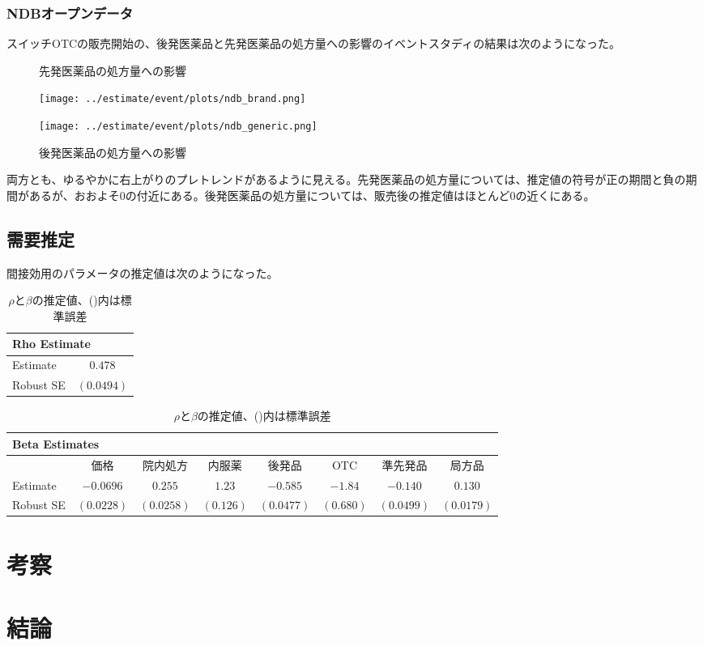 \documentclass[a4paper,11pt,uplatex]{jsarticle}
\theoremstyle{definition}
\begin{document}
\subsubsection{NDBオープンデータ}
スイッチOTCの販売開始の、後発医薬品と先発医薬品の処方量への影響のイベントスタディの結果は次のようになった。
\begin{figure}[H]
    \centering
    \begin{minipage}{0.45\textwidth}
        \caption{先発医薬品の処方量への影響}
        \centering
        \texttt{[image: ../estimate/event/plots/ndb\_brand.png]}
    \end{minipage}\hfill
    \begin{minipage}{0.45\textwidth}
        \caption{後発医薬品の処方量への影響}
        \centering
        \texttt{[image: ../estimate/event/plots/ndb\_generic.png]}
    \end{minipage}
\end{figure}
両方とも、ゆるやかに右上がりのプレトレンドがあるように見える。先発医薬品の処方量については、推定値の符号が正の期間と負の期間があるが、おおよそ0の付近にある。後発医薬品の処方量については、販売後の推定値はほとんど0の近くにある。
\subsection{需要推定}
間接効用のパラメータの推定値は次のようになった。
\begin{table}[H]
    \centering
    \footnotesize
    \caption{\(\rho\)と\(\beta\)の推定値、()内は標準誤差}
    \begin{tabular}{l c}
        \toprule
        \multicolumn{2}{l}{Rho Estimate} \\
        \midrule
        Estimate & $0.478$\\
        \midrule
        Robust SE & $(0.0494)$ \\
        \bottomrule
    \end{tabular}

    \vspace{1em}
    \footnotesize
    \begin{tabular}{lccccccc}
        \toprule
        \multicolumn{8}{l}{Beta Estimates} \\
        \midrule
        & 価格 & 院内処方 & 内服薬 & 後発品 & OTC & 準先発品 & 局方品 \\
        \midrule
        Estimate & $-0.0696$ & $0.255$ & $1.23$ & $-0.585 $ & $-1.84 $ & $-0.140 $ & $0.130 $ \\
        Robust SE & $(0.0228 )$ & $(0.0258 )$ & $(0.126 )$ & $(0.0477)$ & $(0.680)$ & $(0.0499 )$ & $(0.0179 )$ \\
        \bottomrule
    \end{tabular}
\end{table}
\section{考察}

\section{結論} 

\newpage

\end{document}
